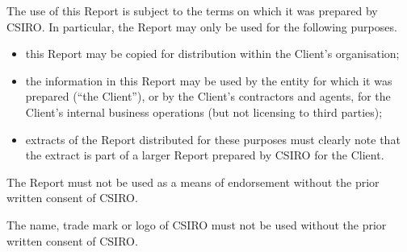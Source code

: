 {



\begin{raggedright}
    {\sffamily
	The use of this Report is subject to the terms on which it was prepared by CSIRO.
	In particular, the Report may only be used for the following purposes.
	\begin{itemize}
	    \item
		this Report may be copied for distribution within the Client's organisation; 
	    \item
		the information in this Report may be used by the entity for which it was prepared
		(``the Client''), or by the Client's contractors and agents, for the Client's
		internal business operations (but not licensing to third parties); 
	    \item
		extracts of the Report distributed for these purposes must clearly note that the
		extract is part of a larger Report prepared by CSIRO for the Client.
	\end{itemize}
	The Report must not be used as a means of endorsement without the prior written consent
	of CSIRO.

	The name, trade mark or logo of CSIRO must not be used without the prior written
	consent of CSIRO.
    }
\end{raggedright}
}

\pagebreak
\mbox{}
\pagebreak
